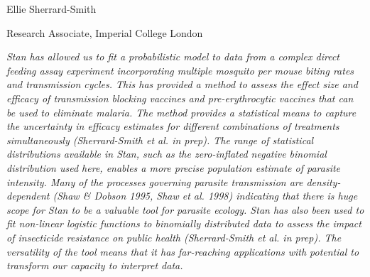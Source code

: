 \documentclass[12pt, oneside]{article}
\begin{document}
\vspace{10mm}

\noindent Ellie Sherrard-Smith

\noindent Research Associate, Imperial College London

\textit{
Stan has allowed us to fit a probabilistic model to data from a complex direct 
feeding assay experiment incorporating multiple mosquito per mouse biting 
rates and transmission cycles. This has provided a method to assess the effect 
size and efficacy of transmission blocking vaccines and pre-erythrocytic vaccines 
that can be used to eliminate malaria. The method provides a statistical means 
to capture the uncertainty in efficacy estimates for different combinations of 
treatments simultaneously (Sherrard-Smith et al. in prep). The range of statistical 
distributions available in Stan, such as the zero-inflated negative binomial 
distribution used here, enables a more precise population estimate of parasite 
intensity. Many of the processes governing parasite transmission are density-dependent 
(Shaw \& Dobson 1995, Shaw et al. 1998) indicating that there is huge scope for 
Stan to be a valuable tool for parasite ecology.  Stan has also been used to fit 
non-linear logistic functions to binomially distributed data to assess the impact 
of insecticide resistance on public health (Sherrard-Smith et al. in prep). The 
versatility of the tool means that it has far-reaching applications with potential to 
transform our capacity to interpret data.}
\end{document}
